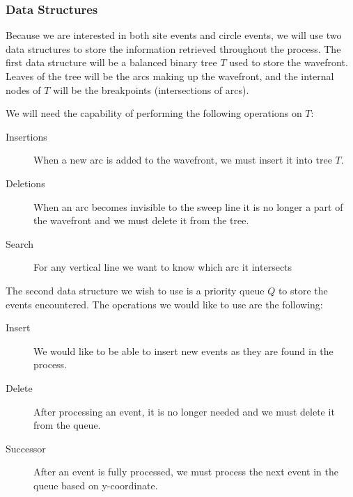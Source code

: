 \documentclass[12pt]{article}
\begin{document}
    \pagebreak
    \subsubsection{Data Structures}
        Because we are interested in both site events and circle events, we will use
        two data structures to store the information retrieved throughout the process.
        The first data structure will be a balanced binary tree $T$ used to store
        the wavefront.  Leaves of the tree will be the arcs making up the wavefront,
        and the internal nodes of $T$ will be the breakpoints (intersections of arcs).

        We will need the capability of performing the following operations on $T$:
        
        \begin{description}

            \item[Insertions] When a new arc is added to the wavefront, we must insert it
            into tree $T$.

            \item[Deletions] When an arc becomes invisible to the sweep line it is no
            longer a part of the wavefront and we must delete it from the tree.

            \item[Search] For any vertical line we want to know which arc it
            intersects

        \end{description}


        The second data structure we wish to use is a priority queue $Q$ to store the
        events encountered.  The operations we would like to use are the following:
        \begin{description}

            \item[Insert] We would like to be able to insert new events as they are found
            in the process.

            \item[Delete] After processing an event, it is no longer needed and we must
            delete it from the queue.

            \item[Successor] After an event is fully processed, we must process the next
            event in the queue based on y-coordinate.

        \end{description}
\end{document}
